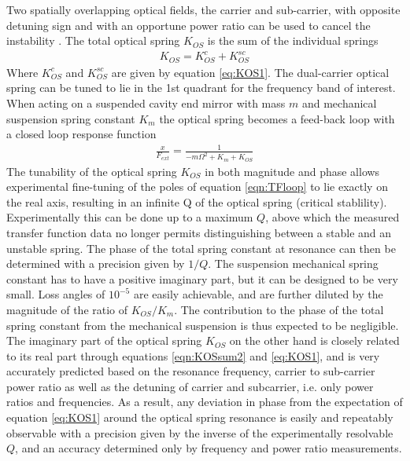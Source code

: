 Two spatially overlapping optical fields, the carrier and sub-carrier, with opposite detuning sign and with an opportune power ratio can be used to cancel the instability \cite{Corbitt07}. The total optical spring $K_{OS}$ is the sum of the individual springs
\begin{eqnarray}
\label{eqn:KOSsum2}
K_{OS}=K_{OS}^c+K_{OS}^{sc}
\end{eqnarray}
Where $K_{OS}^c$ and $K_{OS}^{sc}$ are given by equation \ref{eq:KOS1}. The dual-carrier optical spring
can be tuned to lie in the 1st quadrant for the frequency band of interest. When acting on a suspended cavity end mirror with mass $m$ and mechanical suspension spring constant $K_m$ the optical spring becomes a feed-back loop with a closed loop response function
\begin{eqnarray}
\label{eqn:TFloop}
\frac{x}{F_{ext}}=\frac{1}{-m\Omega^2+K_m+K_{OS}}
\end{eqnarray}
The tunability of the optical spring $K_{OS}$ in both magnitude and phase allows experimental fine-tuning of the poles of equation \ref{eqn:TFloop} to lie exactly on the real axis, resulting in an infinite Q of the optical spring (critical stablility).
Experimentally this can be done up to a maximum $Q$, above which the measured transfer function data no longer permits distinguishing between a stable and an unstable spring. The phase of the total spring constant at resonance can then be determined with a precision given by $1/Q$.
The suspension mechanical spring constant has to have a positive imaginary part, but it can be designed to be very small. Loss angles of $10^{-5}$ are easily achievable, and are further diluted by the magnitude of the ratio of $K_{OS}/K_m$. The contribution to the phase of the total spring constant from the mechanical suspension is thus expected to be negligible. The imaginary part of the optical spring $K_{OS}$ on the other hand is closely related to its real part through equations \ref{eqn:KOSsum2} and \ref{eq:KOS1}, and is very accurately predicted based on the resonance frequency, carrier to sub-carrier power ratio as well as the detuning of carrier and subcarrier, i.e. only power ratios and frequencies. As a result, any deviation in phase from the expectation of equation \ref{eq:KOS1} around the optical spring resonance is easily and repeatably observable with a precision given by the inverse of the experimentally resolvable $Q$, and an accuracy determined only by frequency and power ratio measurements.



